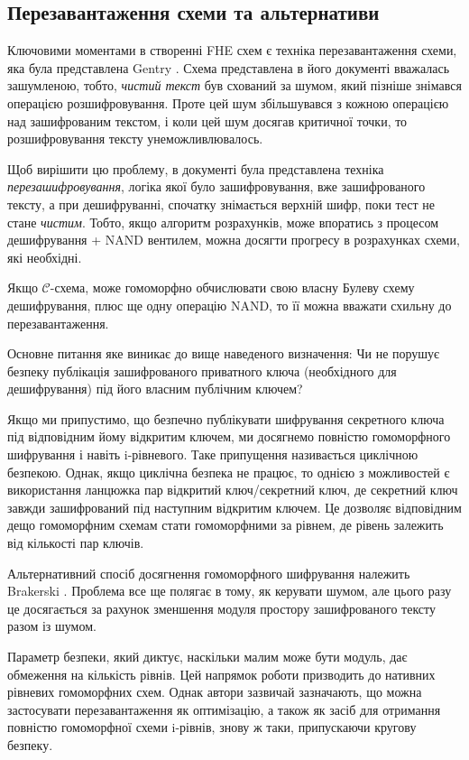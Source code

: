 \subsection{Перезавантаження схеми та альтернативи}
Ключовими моментами в створенні FHE схем є техніка перезавантаження схеми, яка була
представлена Gentry \cite{homenc}. Схема представлена в його документі вважалась зашумленою,
тобто, \emph{чистий текст} був схований за шумом, який пізніше знімався операцією
розшифровування. Проте цей шум збільшувався з кожною операцією над зашифрованим текстом,
і коли цей шум досягав критичної точки, то розшифровування тексту унеможливлювалось.

Щоб вирішити цю проблему, в документі була представлена техніка \emph{перезашифровування},
логіка якої було зашифровування, вже зашифрованого тексту, а при дешифруванні, спочатку
знімається верхній шифр, поки тест не стане \emph{чистим}. Тобто, якщо алгоритм 
розрахунків, може впоратись з процесом дешифрування + \textsc{NAND} вентилем, можна
досягти прогресу в розрахунках схеми, які необхідні.

\begin{definition}
    \label{def:bootstraping}
    Якщо \(\mathcal{C}\)-схема, може гомоморфно обчислювати свою власну Булеву схему
    дешифрування, плюс ще одну операцію \textsc{NAND}, то її можна вважати схильну до
    перезавантаження.
\end{definition}

Основне питання яке виникає до вище наведеного визначення: Чи не порушує безпеку публікація
зашифрованого приватного ключа (необхідного для дешифрування) під його власним публічним
ключем?

Якщо ми припустимо, що безпечно публікувати шифрування секретного ключа під відповідним
йому відкритим ключем, ми досягнемо повністю гомоморфного шифрування і навіть i-рівневого.
Таке припущення називається циклічною безпекою. Однак, якщо циклічна безпека не працює,
то однією з можливостей є використання ланцюжка пар відкритий ключ/секретний ключ, де
секретний ключ завжди зашифрований під наступним відкритим ключем. Це дозволяє відповідним
дещо гомоморфним схемам стати гомоморфними за рівнем, де рівень залежить від кількості пар
ключів.

Альтернативний спосіб досягнення гомоморфного шифрування належить Brakerski
\cite{cryptoeprint:2011/344}. Проблема все ще полягає в тому, як керувати шумом, але цього
разу це досягається за рахунок зменшення модуля простору зашифрованого тексту разом із
шумом.

Параметр безпеки, який диктує, наскільки малим може бути модуль, дає обмеження на кількість
рівнів. Цей напрямок роботи призводить до нативних рівневих гомоморфних схем. Однак автори
зазвичай зазначають, що можна застосувати перезавантаження як оптимізацію, а також як засіб
для отримання повністю гомоморфної схеми i-рівнів, знову ж таки, припускаючи кругову
безпеку.
